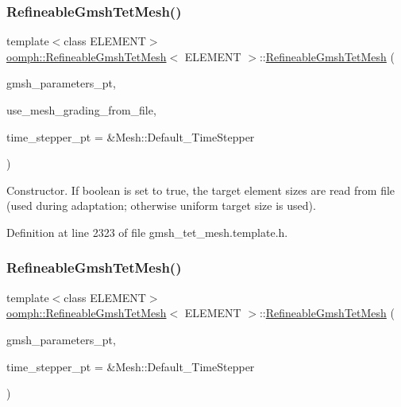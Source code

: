 \subsubsection{\texorpdfstring{Refineable\+Gmsh\+Tet\+Mesh()}{RefineableGmshTetMesh()}\hspace{0.1cm}{\footnotesize\ttfamily [1/2]}}
{\footnotesize\ttfamily template$<$class E\+L\+E\+M\+E\+NT$>$ \\
\hyperlink{classoomph_1_1RefineableGmshTetMesh}{oomph\+::\+Refineable\+Gmsh\+Tet\+Mesh}$<$ E\+L\+E\+M\+E\+NT $>$\+::\hyperlink{classoomph_1_1RefineableGmshTetMesh}{Refineable\+Gmsh\+Tet\+Mesh} (\begin{DoxyParamCaption}\item[{\hyperlink{classoomph_1_1GmshParameters}{Gmsh\+Parameters} $\ast$}]{gmsh\+\_\+parameters\+\_\+pt,  }\item[{const bool \&}]{use\+\_\+mesh\+\_\+grading\+\_\+from\+\_\+file,  }\item[{Time\+Stepper $\ast$}]{time\+\_\+stepper\+\_\+pt = {\ttfamily \&Mesh\+:\+:Default\+\_\+TimeStepper} }\end{DoxyParamCaption})\hspace{0.3cm}{\ttfamily [inline]}}



Constructor. If boolean is set to true, the target element sizes are read from file (used during adaptation; otherwise uniform target size is used). 



Definition at line 2323 of file gmsh\+\_\+tet\+\_\+mesh.\+template.\+h.

\mbox{\label{classoomph_1_1RefineableGmshTetMesh_ac2e041133fd618679af2594465ee4758}} 
\subsubsection{\texorpdfstring{Refineable\+Gmsh\+Tet\+Mesh()}{RefineableGmshTetMesh()}\hspace{0.1cm}{\footnotesize\ttfamily [2/2]}}
{\footnotesize\ttfamily template$<$class E\+L\+E\+M\+E\+NT$>$ \\
\hyperlink{classoomph_1_1RefineableGmshTetMesh}{oomph\+::\+Refineable\+Gmsh\+Tet\+Mesh}$<$ E\+L\+E\+M\+E\+NT $>$\+::\hyperlink{classoomph_1_1RefineableGmshTetMesh}{Refineable\+Gmsh\+Tet\+Mesh} (\begin{DoxyParamCaption}\item[{\hyperlink{classoomph_1_1GmshParameters}{Gmsh\+Parameters} $\ast$}]{gmsh\+\_\+parameters\+\_\+pt,  }\item[{Time\+Stepper $\ast$}]{time\+\_\+stepper\+\_\+pt = {\ttfamily \&Mesh\+:\+:Default\+\_\+TimeStepper} }\end{DoxyParamCaption})\hspace{0.3cm}{\ttfamily [inline]}}



